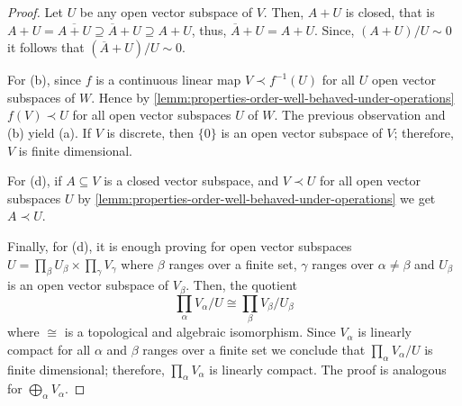 \begin{proof}
	Let $U$ be any open vector subspace of $V$. Then, $A + U$ is closed, that is $A + U = \overline{A + U} \supseteq \overline{A} + U \supseteq A + U$, thus, $\overline{A} + U = A + U$. Since, $(A + U)/U \sim 0$ it follows that $(\overline{A} + U)/U \sim 0$. 

	For (b), since $f$ is a continuous linear map $V \prec f^{-1}(U)$ for all $U$ open vector subspaces of $W$. Hence by \cref{lemm:properties-order-well-behaved-under-operations} $f(V) \prec U$ for all open vector subspaces $U$ of $W$. The previous observation and (b) yield (a). If $V$ is discrete, then $\{0\}$ is an open vector subspace of $V$; therefore, $V$ is finite dimensional.

	For (d), if $A \subseteq V$ is a closed vector subspace, and $V \prec U$ for all open vector subspaces $U$ by \cref{lemm:properties-order-well-behaved-under-operations} we get $A \prec U$. 

	Finally, for (d), it is enough proving for open vector subspaces $U = \prod_{\beta} U_{\beta} \times \prod_{\gamma} V_{\gamma}$ where $\beta$ ranges over a finite set, $\gamma$ ranges over $\alpha \neq \beta$ and $U_{\beta}$ is an open vector subspace of $V_{\beta}$. Then, the quotient
	\[
		\prod_{\alpha}V_{\alpha} / U \cong \prod_{\beta} V_{\beta}/U_{\beta}
	\]
	where $\cong$ is a topological and algebraic isomorphism. Since $V_{\alpha}$ is linearly compact for all $\alpha$ and $\beta$ ranges over a finite set we conclude that $\prod_{\alpha} V_{\alpha} / U$ is finite dimensional; therefore, $\prod_{\alpha} V_{\alpha}$ is linearly compact. The proof is analogous for $\bigoplus_{\alpha} V_{\alpha}$.
\end{proof} 
